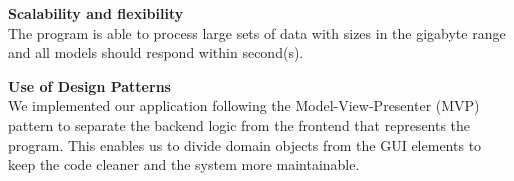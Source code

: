\textbf{Scalability and flexibility}\\
The program is able to process large sets of data with sizes in the gigabyte range and all models should respond within second(s).

\textbf{Use of Design Patterns} \\
We implemented our application following the Model-View-Presenter (MVP) pattern to separate the backend logic from the frontend that represents the program. This enables us to divide domain objects from the GUI elements to keep the code cleaner and the system more maintainable.
